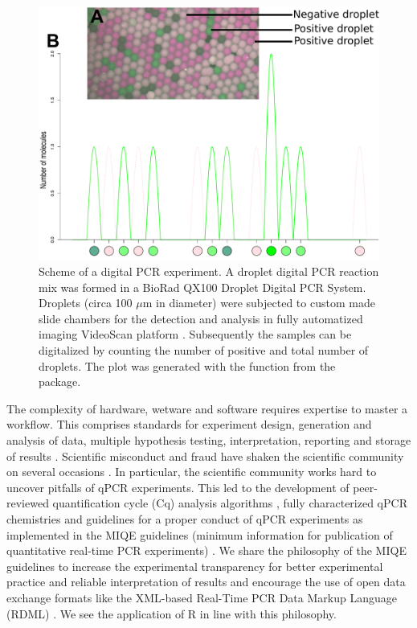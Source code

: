 \begin{figure}[htbp]
  \centering
  \includegraphics[clip=true,trim=0.1cm 0.3cm 0.2cm 0.1cm, width=12cm]{figures/dpcR_sim.pdf} \caption{Scheme 
of a digital PCR experiment.  A droplet digital PCR reaction 
mix was formed in a BioRad QX100 Droplet Digital PCR System. Droplets (circa 
100 $\mu$m in diameter) were subjected to custom made slide chambers for the 
detection and analysis in fully automatized imaging VideoScan platform 
\citep{rodiger_highly_2013}.  Subsequently the samples can be 
digitalized by counting the number of positive and total number of droplets. The 
plot was generated with the  function from the  
package.}
\label{figure:dpcR_sim}
\end{figure}

The complexity of hardware, wetware and software requires expertise to master a 
workflow. This comprises standards for experiment design, generation and 
analysis of data, multiple hypothesis testing, interpretation, reporting and 
storage of results \citep{huggett_BDQ_2014, conde_2014}. Scientific misconduct 
and fraud have shaken the scientific community on several occasions 
\citep{bustin_2014}. In particular, the scientific community works hard to 
uncover pitfalls of qPCR experiments. This led to the development of 
peer-reviewed quantification cycle (Cq) analysis algorithms 
\citep{ruijter_2013}, fully characterized qPCR chemistries \citep{ruijter_2014} 
and guidelines for a proper conduct of qPCR experiments as implemented in the 
MIQE guidelines (minimum information for publication of quantitative real-time 
PCR experiments) \citep{huggett_2013, bustin_2014}. We share the philosophy of 
the MIQE guidelines to increase the experimental transparency for better 
experimental practice and reliable interpretation of results and encourage the 
use of open data exchange formats like the XML-based Real-Time PCR Data Markup 
Language (RDML) \citep{lefever_2009}. We see the application of R in line with 
this philosophy. 

